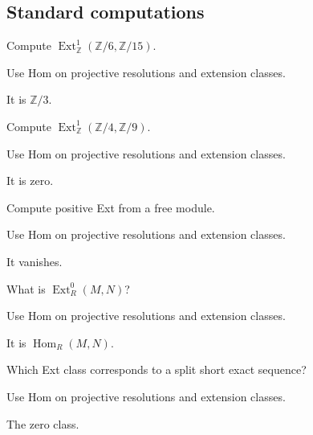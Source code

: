 \subsection*{Standard computations}

\begin{exercise}\label{exr:v27-expand-01}
Compute $\operatorname{Ext}^1_{\mathbb Z}(\mathbb Z/6,\mathbb Z/15)$.
\end{exercise}
\begin{hint}
Use Hom on projective resolutions and extension classes.
\end{hint}
\begin{solution}
It is $\mathbb Z/3$.
\end{solution}

\begin{exercise}\label{exr:v27-expand-02}
Compute $\operatorname{Ext}^1_{\mathbb Z}(\mathbb Z/4,\mathbb Z/9)$.
\end{exercise}
\begin{hint}
Use Hom on projective resolutions and extension classes.
\end{hint}
\begin{solution}
It is zero.
\end{solution}

\begin{exercise}[Projective]\label{exr:v27-expand-03}
Compute positive Ext from a free module.
\end{exercise}
\begin{hint}
Use Hom on projective resolutions and extension classes.
\end{hint}
\begin{solution}
It vanishes.
\end{solution}

\begin{exercise}\label{exr:v27-expand-04}
What is $\operatorname{Ext}^0_R(M,N)$?
\end{exercise}
\begin{hint}
Use Hom on projective resolutions and extension classes.
\end{hint}
\begin{solution}
It is $\operatorname{Hom}_R(M,N)$.
\end{solution}

\begin{exercise}\label{exr:v27-expand-05}
Which Ext class corresponds to a split short exact sequence?
\end{exercise}
\begin{hint}
Use Hom on projective resolutions and extension classes.
\end{hint}
\begin{solution}
The zero class.
\end{solution}

